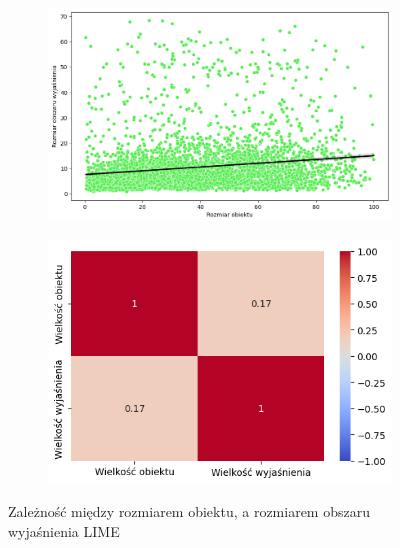 \begin{figure}[h]
	\centering
	\begin{subfigure}[b]{0.45\textwidth}
		\includegraphics[width=.9\textwidth]{img/size_exp_lime}
	\end{subfigure}
	\begin{subfigure}[b]{0.45\textwidth}
		\includegraphics[width=.9\textwidth]{img/size_exp_lime_corr}
	\end{subfigure}
	\caption{Zależność między rozmiarem obiektu, a rozmiarem obszaru wyjaśnienia LIME}
\end{figure}

